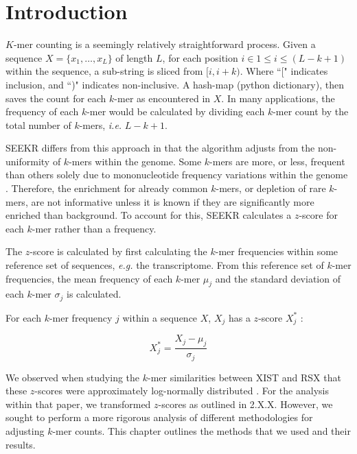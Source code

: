 \section{Introduction}
$K$-mer counting is a seemingly relatively straightforward process. Given a sequence $X = \{x_1,\dots,x_L\}$ of length $L$, for each position $i\in 1\leq i\leq \left(L-k+1\right)$ within the sequence, a sub-string is sliced from $[i,i+k)$. Where ``[" indicates inclusion, and ``)" indicates non-inclusive. A hash-map (python dictionary), then saves the count for each $k$-mer as encountered in $X$. In many applications, the frequency of each $k$-mer would be calculated by dividing each $k$-mer count by the total number of $k$-mers, \emph{i.e.} $L-k+1$. 

SEEKR differs from this approach in that the algorithm adjusts from the non-uniformity of $k$-mers within the genome. Some $k$-mers are more, or less, frequent than others solely due to mononucleotide frequency variations within the genome \cite{Haubold2014Alignment-freeGenetics,Yang2008PerformanceReconstruction}. Therefore, the enrichment for already common $k$-mers, or depletion of rare $k$-mers, are not informative unless it is known if they are significantly more enriched than background. To account for this, SEEKR calculates a $z$-score for each $k$-mer rather than a frequency.

The $z$-score is calculated by first calculating the $k$-mer frequencies within some reference set of sequences, \emph{e.g.} the transcriptome. From this reference set of $k$-mer frequencies, the mean frequency of each $k$-mer $\mu_j$ and the standard deviation of each $k$-mer $\sigma_j$ is calculated. 

For each $k$-mer frequency $j$ within a sequence $X$, $X_j$ has a $z$-score $X^*_j$ \cite{Kirk2018FunctionalContent}: 

\begin{equation}
    X_j^* = \frac{X_j-\mu_j}{\sigma_j}
    \label{eq:zscore}
\end{equation}

We observed when studying the $k$-mer similarities between XIST and RSX that these $z$-scores were approximately log-normally distributed \cite{Sprague2019NonlinearDomains}. For the analysis within that paper, we transformed $z$-scores as outlined in 2.X.X. However, we sought to perform a more rigorous analysis of different methodologies for adjusting $k$-mer counts. This chapter outlines the methods that we used and their results. 

